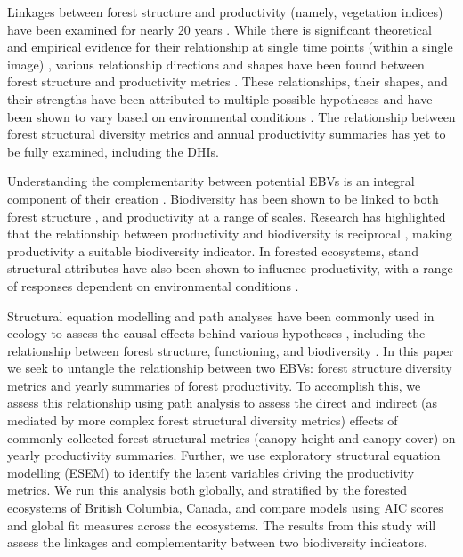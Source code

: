 \documentclass[
  authoryear,
  review,
  3p,
  twocolumn]{elsarticle}
\begin{document}
Linkages between forest structure and productivity (namely, vegetation
indices) have been examined for nearly 20 years \citetext{\citealp[
\citet{knyazikhin1998}]{huete2002}; \citealp{myneni1994}}. While there
is significant theoretical and empirical evidence for their relationship
at single time points (within a single image) \citep{myneni1994},
various relationship directions and shapes have been found between
forest structure and productivity metrics \citep{ali2019}. These
relationships, their shapes, and their strengths have been attributed to
multiple possible hypotheses and have been shown to vary based on
environmental conditions \citep{ali2019}. The relationship between
forest structural diversity metrics and annual productivity summaries
has yet to be fully examined, including the DHIs.

Understanding the complementarity between potential EBVs is an integral
component of their creation \citep{skidmore2021}. Biodiversity has been
shown to be linked to both forest structure \citep{guo2017, gao2014},
and productivity \citep{radeloff2019} at a range of scales. Research has
highlighted that the relationship between productivity and biodiversity
is reciprocal \citep{worm2003}, making productivity a suitable
biodiversity indicator. In forested ecosystems, stand structural
attributes have also been shown to influence productivity, with a range
of responses dependent on environmental conditions \citep{ali2019}.

Structural equation modelling and path analyses have been commonly used
in ecology to assess the causal effects behind various hypotheses
\citep{fan2016, grace2010}, including the relationship between forest
structure, functioning, and biodiversity \citep{ali2019} . In this paper
we seek to untangle the relationship between two EBVs: forest structure
diversity metrics and yearly summaries of forest productivity. To
accomplish this, we assess this relationship using path analysis to
assess the direct and indirect (as mediated by more complex forest
structural diversity metrics) effects of commonly collected forest
structural metrics (canopy height and canopy cover) on yearly
productivity summaries. Further, we use exploratory structural equation
modelling (ESEM) to identify the latent variables driving the
productivity metrics. We run this analysis both globally, and stratified
by the forested ecosystems of British Columbia, Canada, and compare
models using AIC scores and global fit measures across the ecosystems.
The results from this study will assess the linkages and complementarity
between two biodiversity indicators.
\end{document}
